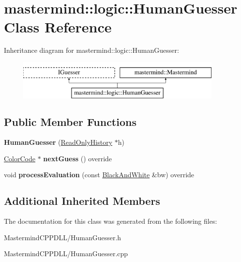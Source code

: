 \hypertarget{classmastermind_1_1logic_1_1_human_guesser}{}\section{mastermind\+:\+:logic\+:\+:Human\+Guesser Class Reference}
\label{classmastermind_1_1logic_1_1_human_guesser}
Inheritance diagram for mastermind\+:\+:logic\+:\+:Human\+Guesser\+:\begin{figure}[H]
\begin{center}
\leavevmode
\includegraphics[height=2.000000cm]{classmastermind_1_1logic_1_1_human_guesser}
\end{center}
\end{figure}
\subsection*{Public Member Functions}
\begin{DoxyCompactItemize}
\item 
\hypertarget{classmastermind_1_1logic_1_1_human_guesser_a877ab01fca174b802a041cfabf16e468}{}\label{classmastermind_1_1logic_1_1_human_guesser_a877ab01fca174b802a041cfabf16e468} 
{\bfseries Human\+Guesser} (\hyperlink{classmastermind_1_1logic_1_1_read_only_history}{Read\+Only\+History} $\ast$h)
\item 
\hypertarget{classmastermind_1_1logic_1_1_human_guesser_a5a165250f667fd40099c43cd3caf487c}{}\label{classmastermind_1_1logic_1_1_human_guesser_a5a165250f667fd40099c43cd3caf487c} 
\hyperlink{classmastermind_1_1logic_1_1_color_code}{Color\+Code} $\ast$ {\bfseries next\+Guess} () override
\item 
\hypertarget{classmastermind_1_1logic_1_1_human_guesser_ad1c868e2dac07c1af9bb8935783e2e9b}{}\label{classmastermind_1_1logic_1_1_human_guesser_ad1c868e2dac07c1af9bb8935783e2e9b} 
void {\bfseries process\+Evaluation} (const \hyperlink{classmastermind_1_1logic_1_1_black_and_white}{Black\+And\+White} \&bw) override
\end{DoxyCompactItemize}
\subsection*{Additional Inherited Members}


The documentation for this class was generated from the following files\+:\begin{DoxyCompactItemize}
\item 
Mastermind\+C\+P\+P\+D\+L\+L/Human\+Guesser.\+h\item 
Mastermind\+C\+P\+P\+D\+L\+L/Human\+Guesser.\+cpp\end{DoxyCompactItemize}
